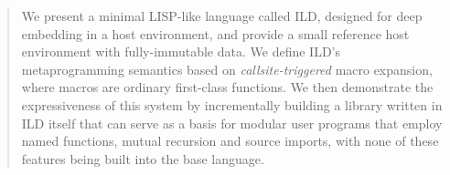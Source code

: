 \begin{abstract}
We present a minimal LISP-like language called ILD, designed for deep embedding
in a host environment, and provide a small reference host environment with
fully-immutable data. We define ILD's metaprogramming semantics based on
\emph{callsite-triggered} macro expansion, where macros are ordinary
first-class functions. We then demonstrate the expressiveness of this system by
incrementally building a library written in ILD itself that can serve as a
basis for modular user programs that employ named functions, mutual recursion
and source imports, with none of these features being built into the base
language.
\end{abstract}
